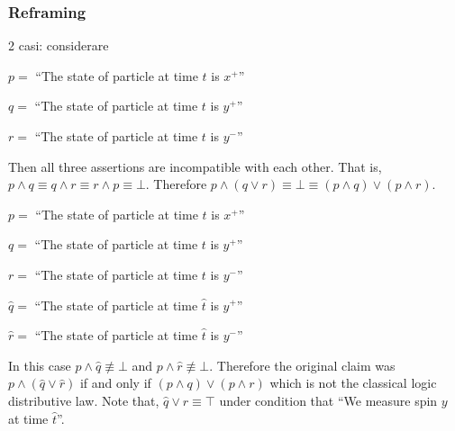\documentclass[11pt, executivepaper]{article}
\begin{document}
\subsubsection{Reframing}

2 casi: considerare

\begin{description}
    \item $p =$ ``The state of particle at time $t$ is $x^+$''
    \item $q =$ ``The state of particle at time $t$ is $y^+$''
    \item $r =$ ``The state of particle at time $t$ is $y^-$''
\end{description}

Then all three assertions are incompatible with each other. That is, $p \wedge q \equiv q \wedge r \equiv r \wedge p \equiv \bot$. Therefore $p \wedge (q \vee r) \equiv \bot \equiv (p \wedge  q) \vee (p \wedge r)$.

\begin{description}
    \item $p =$ ``The state of particle at time $t$ is $x^+$''
    \item $q =$ ``The state of particle at time $t$ is $y^+$''
    \item $r =$ ``The state of particle at time $t$ is $y^-$''
    \item $\hat{q} =$ ``The state of particle at time $\hat{t}$ is $y^+$''
    \item $\hat{r} =$ ``The state of particle at time $\hat{t}$ is $y^-$''
\end{description}

In this case $p \wedge \hat{q} \not\equiv \bot$ and $p \wedge \hat{r} \not\equiv \bot$. Therefore the original claim was $p \wedge (\hat{q} \vee \hat{r})$ if and only if $(p \wedge  q) \vee (p \wedge r)$ which is not the classical logic distributive law. Note that, $\hat{q} \vee \hat{r} \equiv \top$ under condition that ``We measure spin $y$ at time $\hat{t}$''.
\end{document}
